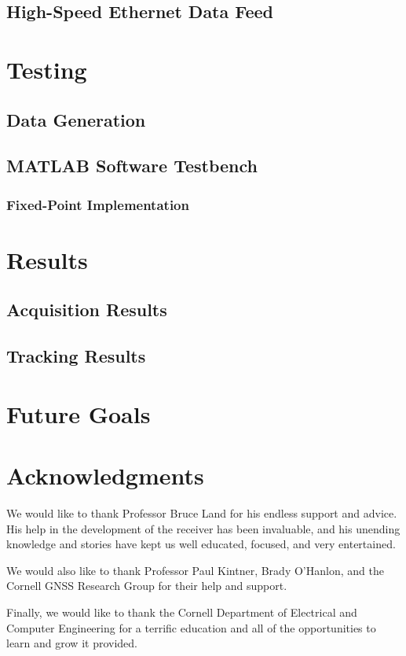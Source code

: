 \documentclass[12pt]{article}
\begin{document}
\subsection{High-Speed Ethernet Data Feed}

\section{Testing}

\subsection{Data Generation}

\subsection{MATLAB Software Testbench}

\subsubsection{Fixed-Point Implementation}

\section{Results}

\subsection{Acquisition Results}

\subsection{Tracking Results}

\section{Future Goals}

\section{Acknowledgments}
We would like to thank Professor Bruce Land for his endless support and advice. His help in the development of the receiver has been invaluable, and his unending knowledge and stories have kept us well educated, focused, and very entertained.

We would also like to thank Professor Paul Kintner, Brady O'Hanlon, and the Cornell GNSS Research Group for their help and support.

Finally, we would like to thank the Cornell Department of Electrical and Computer Engineering for a terrific education and all of the opportunities to learn and grow it provided.
\end{document}
